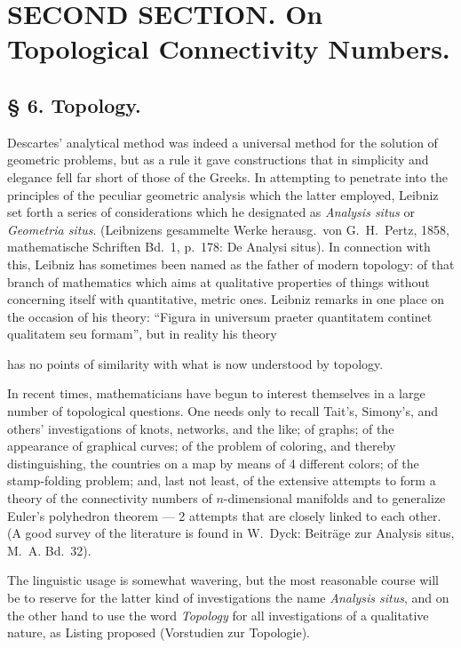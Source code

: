 \documentclass{article}
\begin{document}
\section*{SECOND SECTION. On Topological Connectivity Numbers.}

\subsection*{§ 6. Topology.}

Descartes' analytical method was indeed a universal method for the solution of geometric problems, but as a rule it gave constructions that in simplicity and elegance fell far short of those of the Greeks. In attempting to penetrate into the principles of the peculiar geometric analysis which the latter employed, Leibniz set forth a series of considerations which he designated as \emph{Analysis situs} or \emph{Geometria situs}. (Leibnizens gesammelte Werke herausg.\ von G.~H.~Pertz, 1858, mathematische Schriften Bd.\ 1, p.\ 178: De Analysi situs). In connection with this, Leibniz has sometimes been named as the father of modern topology: of that branch of mathematics which aims at qualitative properties of things without concerning itself with quantitative, metric ones. Leibniz remarks in one place on the occasion of his theory: “Figura in universum praeter quantitatem continet qualitatem seu formam”, but in reality his theory

has no points of similarity with what is now understood by topology.

In recent times, mathematicians have begun to interest themselves in a large number of topological questions. One needs only to recall Tait's, Simony's, and others' investigations of knots, networks, and the like; of graphs; of the appearance of graphical curves; of the problem of coloring, and thereby distinguishing, the countries on a map by means of 4 different colors; of the stamp-folding problem; and, last not least, of the extensive attempts to form a theory of the connectivity numbers of $n$-dimensional manifolds and to generalize Euler's polyhedron theorem --- 2 attempts that are closely linked to each other. (A good survey of the literature is found in W.~Dyck: Beiträge zur Analysis situs, M.~A. Bd.\ 32).

The linguistic usage is somewhat wavering, but the most reasonable course will be to reserve for the latter kind of investigations the name \emph{Analysis situs}, and on the other hand to use the word \emph{Topology} for all investigations of a qualitative nature, as Listing proposed (Vorstudien zur Topologie).
\end{document}

